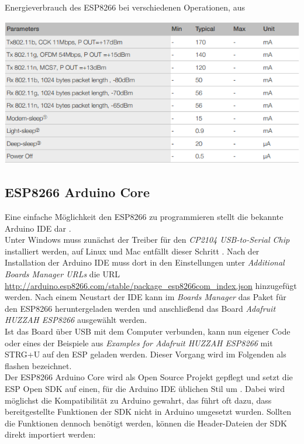\begin{table}[h]
  \centering
  \caption{Energieverbrauch des ESP8266 bei verschiedenen Operationen, aus \cite{espressif2017esp8266}}
	\includegraphics[width=\textwidth]{images/esppower.png}

  \label{table:esppower}
\end{table}


\subsection{ESP8266 Arduino Core}
Eine einfache Möglichkeit den ESP8266 zu programmieren stellt die bekannte Arduino IDE dar \cite{banzi2017arduino}.\\
Unter Windows muss zunächst der Treiber für den \textit{CP2104 USB-to-Serial Chip} installiert werden, auf Linux und Mac entfällt dieser Schritt \cite{fried2017feather}.
Nach der Installation der Arduino IDE muss dort in den Einstellungen unter \textit{Additional Boards Manager URLs} die URL \url{http://arduino.esp8266.com/stable/package_esp8266com_index.json} hinzugefügt werden.  
Nach einem Neustart der IDE kann im \textit{Boards Manager} das Paket für den ESP8266 heruntergeladen werden und anschließend das Board \textit{Adafruit HUZZAH ESP8266} ausgewählt werden. \\
Ist das Board über USB mit dem Computer verbunden, kann nun eigener Code oder eines der Beispiele aus \textit{Examples for Adafruit HUZZAH ESP8266} mit STRG+U auf den ESP geladen werden. 
Dieser Vorgang wird im Folgenden als flashen bezeichnet. \\
Der ESP8266 Arduino Core wird als Open Source Projekt gepflegt und setzt die ESP Open SDK auf einen, für die Arduino IDE üblichen Stil um \cite{arduino2017core}. 
Dabei wird möglichst die Kompatibilität zu Arduino gewahrt, das führt oft dazu, dass bereitgestellte Funktionen der SDK nicht in Arduino umgesetzt wurden.
Sollten die Funktionen dennoch benötigt werden, können die Header-Dateien der SDK direkt importiert werden:

